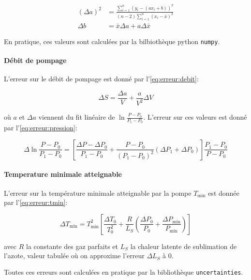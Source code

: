 \begin{equation}
    \label{eq:erreur:fit}
    \begin{aligned}
        (\Delta a)^2 &= \frac{\sum_{i=1}^{n}(y_i - (a x_i + b))^2}{(n-2) \sum_{i=1}^{n}(x_i - \bar{x})^2}\\
        \Delta b &= \bar{x} \Delta a + a \Delta \bar{x}
    \end{aligned}
\end{equation}

En pratique, ces valeurs sont calculées par la bilbiothèque python \texttt{numpy}.

\paragraph*{Débit de pompage}
L'erreur sur le débit de pompage est donné par l'\autoref{eq:erreur:debit}:

\begin{equation}
    \Delta S = \frac{\Delta a}{V} + \frac{a}{V^2} \Delta V
    \label{eq:erreur:debit}
\end{equation}

où \(a\) et \(\Delta a\) viennent du fit linéaire de \(\ln{\frac{P - P_0}{P_1 - P_0}}\). L'erreur sur ces valeurs est donné par l'\autoref{eq:erreur:pression}:

\begin{equation}
    \Delta \ln{\frac{P - P_0}{P_1 - P_0}} = \left[\frac{\Delta P - \Delta P_0}{P_1 - P_0} + \frac{P - P_0}{(P_1 - P_0)^2}(\Delta P_1 + \Delta P_0)\right] \frac{P_1 - P_0}{P - P_0}
    \label{eq:erreur:pression}
\end{equation}


\paragraph*{Temperature minimale atteignable}
L'erreur sur la température minimale atteignable par la pompe \(T_\textrm{min}\) est donnée par l'\autoref{eq:erreur:tmin}:

\begin{equation}
    \Delta T_\textrm{min} = T_\textrm{min}^2\left[\frac{\Delta T_0}{T_0^2} + \frac{R}{L_S}\left(\frac{\Delta P_0}{P_0} + \frac{\Delta P_\textrm{min}}{P_\textrm{min}}\right)\right]
    \label{eq:erreur:tmin}
\end{equation}

avec \(R\) la constante des gaz parfaits et \(L_S\) la chaleur latente de sublimation de l'azote, valeur tabulée où on approxime l'erreur \(\Delta L_S\) à 0.

Toutes ces erreurs sont calculées en pratique par la bibliothèque \texttt{uncertainties}.
